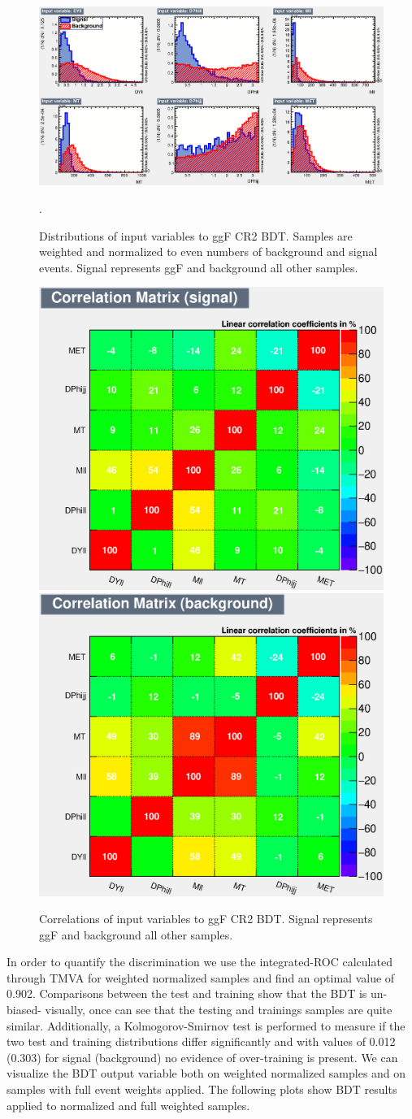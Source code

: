 \begin{figure}[!htbp]
    \centering
    \includegraphics[width=0.65\linewidth]{Pictures/ggFCR2/variables_id_c1.eps}
    \caption{Distributions of input variables to ggF CR2 BDT. Samples are weighted and normalized to even numbers of background and signal events. Signal represents ggF and background all other samples.}.
    \label{fig:ggFCR2BDTinput}
\end{figure}
\begin{figure}[!htbp]
\centering
  \includegraphics[width=.4\linewidth]{Pictures/ggFCR2/CorrelationMatrixS.eps}
  \includegraphics[width=.4\linewidth]{Pictures/ggFCR2/CorrelationMatrixB.eps}
\caption{Correlations of input variables to ggF CR2 BDT. Signal represents ggF and background all other samples.}
\label{fig:ggFCR2corrSB}
\end{figure}

In order to quantify the discrimination we use the integrated-ROC calculated through TMVA for weighted normalized samples and find an optimal value of 0.902. Comparisons between the test and training show that the BDT is un-biased- visually, once can see that the testing and trainings samples are quite similar. Additionally, a Kolmogorov-Smirnov test is performed to measure if the two test and training distributions differ significantly and with values of 0.012 (0.303) for signal (background) no evidence of over-training is present. We can visualize the BDT output variable both on weighted normalized samples and on samples with full event weights applied. The following plots show BDT results applied to normalized and full weighted samples.

